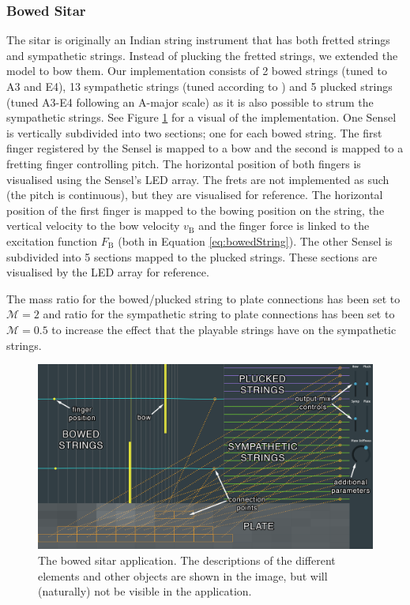 \documentclass{article}
\begin{document}
\subsubsection{Bowed Sitar}
The sitar is originally an Indian string instrument that has both fretted strings and sympathetic strings. Instead of plucking the fretted strings, we extended the model to bow them. Our implementation consists of 2 bowed strings (tuned to A3 and E4), 13 sympathetic strings (tuned according to \cite{sitarTuning}) and 5 plucked strings (tuned A3-E4 following an A-major scale) as it is also possible to strum the sympathetic strings. See Figure \ref{fig:bowedSitar} for a visual of the implementation. One Sensel is vertically subdivided into two sections; one for each bowed string. The first finger registered by the Sensel is mapped to a bow and the second is mapped to a fretting finger controlling pitch. The horizontal position of both fingers is visualised using the Sensel's LED array. The frets are not implemented as such (the pitch is continuous), but they are visualised for reference. The horizontal position of the first finger is mapped to the bowing position on the string, the vertical velocity to the bow velocity $v_\text{B}$ and the finger force is linked to the excitation function $F_\text{B}$ (both in Equation \eqref{eq:bowedString}). The other Sensel is subdivided into 5 sections mapped to the plucked strings. These sections are visualised by the LED array for reference.

The mass ratio for the bowed/plucked string to plate connections has been set to $\mathcal{M} = 2$ and ratio for the sympathetic string to plate connections has been set to $\mathcal{M} = 0.5$ to increase the effect that the playable strings have on the sympathetic strings.

\begin{figure}[h]
\centering
\includegraphics[width=1.0\columnwidth]{BowedSitar.png}
\caption{The bowed sitar application. The descriptions of the different elements and other objects are shown in the image, but will (naturally) not be visible in the application. \label{fig:bowedSitar}}
\end{figure}
\end{document}
